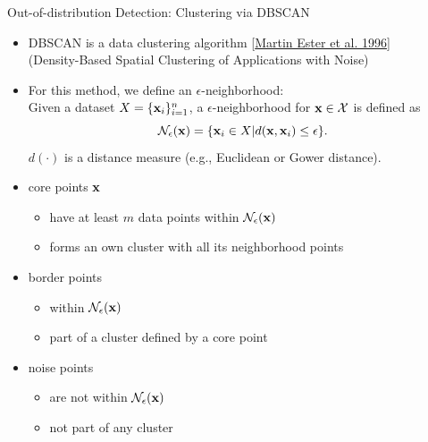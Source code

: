 \documentclass[11pt,compress,t,notes=noshow, aspectratio=169, xcolor=table]{beamer}
\begin{document}
\begin{frame}[c]{Out-of-distribution Detection: Clustering via DBSCAN}
\begin{itemize}
	\item DBSCAN is a data clustering algorithm [\href{https://www.aaai.org/Papers/KDD/1996/KDD96-037.pdf}{Martin Ester et al. 1996}] \\ (Density-Based Spatial Clustering of Applications with Noise) 
	\item For this method, we define an $\epsilon$-neighborhood: \\
	Given a dataset $X = \{\xv_i\}_{i = 1}^n$, a $\epsilon$-neighborhood for $\xv \in \Xspace$ is defined as 
	$$ \mathcal{N}_{\epsilon}(\xv) = \{\xv_i \in X | d(\xv, \xv_i) \le \epsilon\}.$$
	 $d(\cdot)$ is a distance measure (e.g., Euclidean or Gower distance). 
	\item core points $\xv$
	\begin{itemize}
	    \item have at least $m$ data points within $\mathcal{N}_{\epsilon}(\xv)$
	    \item forms an own cluster with all its neighborhood points
	\end{itemize}
    \item border points
    \begin{itemize}
        \item within $\mathcal{N}_{\epsilon}(\xv)$
        \item part of a cluster defined by a core point
    \end{itemize}
    \item noise points
    \begin{itemize}
        \item are not within $\mathcal{N}_{\epsilon}(\xv)$
        \item not part of any cluster
    \end{itemize}
\end{itemize}
\end{frame}
\end{document}
